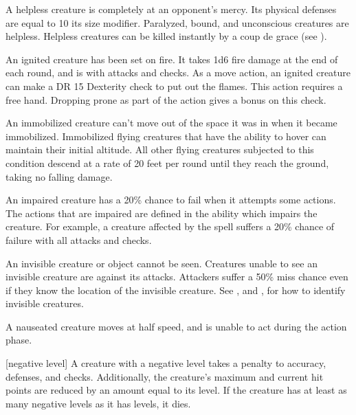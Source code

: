 A helpless creature is completely at an opponent's mercy. Its physical defenses are equal to 10 \add its size modifier. Paralyzed, bound, and unconscious creatures are helpless. Helpless creatures can be killed instantly by a coup de grace (see ).

 An ignited creature has been set on fire. It takes 1d6 fire damage at the end of each round, and is \impaired with attacks and checks. As a move action, an ignited creature can make a DR 15 Dexterity check to put out the flames. This action requires a free hand. Dropping prone as part of the action gives a  bonus on this check.

 An immobilized creature can't move out of the space it was in when it became immobilized. Immobilized flying creatures that have the ability to hover can maintain their initial altitude. All other flying creatures subjected to this condition descend at a rate of 20 feet per round until they reach the ground, taking no falling damage.

 An impaired creature has a 20\% chance to fail when it attempts some actions. The actions that are impaired are defined in the ability which impairs the creature. For example, a creature affected by the  spell suffers a 20\% chance of failure with all attacks and checks.

 An invisible creature or object cannot be seen. Creatures unable to see an invisible creature are  against its attacks. Attackers suffer a 50\% miss chance even if they know the location of the invisible creature. See , and , for how to identify invisible creatures.


 A nauseated creature moves at half speed, and is unable to act during the action phase.

[negative level] A creature with a negative level takes a  penalty to accuracy, defenses, and checks. Additionally, the creature's maximum and current hit points are reduced by an amount equal to its level. If the creature has at least as many negative levels as it has levels, it dies.

